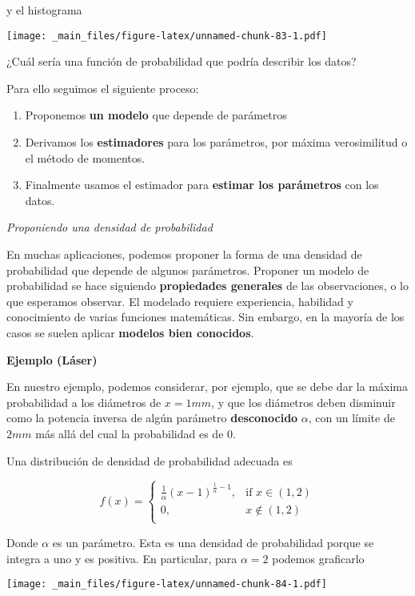 \documentclass[
]{book}
\providecommand{\tightlist}{%
  \setlength{\itemsep}{0pt}\setlength{\parskip}{0pt}}
\begin{document}
y el histograma

\texttt{[image: \_main\_files/figure-latex/unnamed-chunk-83-1.pdf]}

¿Cuál sería una función de probabilidad que podría describir los datos?

Para ello seguimos el siguiente proceso:

\begin{enumerate}
\def\labelenumi{\arabic{enumi}.}
\tightlist
\item
  Proponemos \textbf{un modelo} que depende de parámetros
\item
  Derivamos los \textbf{estimadores} para los parámetros, por máxima verosimilitud o el método de momentos.
\item
  Finalmente usamos el estimador para \textbf{estimar los parámetros} con los datos.
\end{enumerate}

\emph{Proponiendo una densidad de probabilidad}

En muchas aplicaciones, podemos proponer la forma de una densidad de probabilidad que depende de algunos parámetros. Proponer un modelo de probabilidad se hace siguiendo \textbf{propiedades generales} de las observaciones, o lo que esperamos observar. El modelado requiere experiencia, habilidad y conocimiento de varias funciones matemáticas. Sin embargo, en la mayoría de los casos se suelen aplicar \textbf{modelos bien conocidos}.

\textbf{Ejemplo (Láser)}

En nuestro ejemplo, podemos considerar, por ejemplo, que se debe dar la máxima probabilidad a los diámetros de \(x=1 mm\), y que los diámetros deben disminuir como la potencia inversa de algún parámetro \textbf{desconocido} \(\alpha\), con un límite de \(2mm\) más allá del cual la probabilidad es de \(0\).

Una distribución de densidad de probabilidad adecuada es

\[
    f(x)= 
\begin{cases}
\frac{1}{\alpha}(x-1)^{\frac{1}{\alpha}-1},& \text{if } x \in (1,2)\\
    0,& x \notin (1,2)\\
\end{cases}
\]

Donde \(\alpha\) es un parámetro. Esta es una densidad de probabilidad porque se integra a uno y es positiva. En particular, para \(\alpha=2\) podemos graficarlo

\texttt{[image: \_main\_files/figure-latex/unnamed-chunk-84-1.pdf]}
\end{document}
